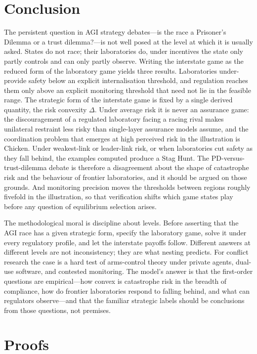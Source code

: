 \documentclass[11pt]{article}
\theoremstyle{plain}
\theoremstyle{definition}
\theoremstyle{remark}
\newcommand{\Delt}{\Delta}
\begin{document}
\section{Conclusion}

The persistent question in AGI strategy debates---is the race a Prisoner's Dilemma or a trust dilemma?---is not well posed at the level at which it is usually asked. States do not race; their laboratories do, under incentives the state only partly controls and can only partly observe. Writing the interstate game as the reduced form of the laboratory game yields three results. Laboratories under-provide safety below an explicit internalisation threshold, and regulation reaches them only above an explicit monitoring threshold that need not lie in the feasible range. The strategic form of the interstate game is fixed by a single derived quantity, the risk convexity $\Delt$. Under average risk it is never an assurance game: the discouragement of a regulated laboratory facing a racing rival makes unilateral restraint less risky than single-layer assurance models assume, and the coordination problem that emerges at high perceived risk in the illustration is Chicken. Under weakest-link or leader-link risk, or when laboratories cut safety as they fall behind, the examples computed produce a Stag Hunt. The PD-versus-trust-dilemma debate is therefore a disagreement about the shape of catastrophe risk and the behaviour of frontier laboratories, and it should be argued on those grounds. And monitoring precision moves the thresholds between regions roughly fivefold in the illustration, so that verification shifts which game states play before any question of equilibrium selection arises.

The methodological moral is discipline about levels. Before asserting that the AGI race has a given strategic form, specify the laboratory game, solve it under every regulatory profile, and let the interstate payoffs follow. Different answers at different levels are not inconsistency; they are what nesting predicts. For conflict research the case is a hard test of arms-control theory under private agents, dual-use software, and contested monitoring. The model's answer is that the first-order questions are empirical---how convex is catastrophe risk in the breadth of compliance, how do frontier laboratories respond to falling behind, and what can regulators observe---and that the familiar strategic labels should be conclusions from those questions, not premises.

\appendix
\section{Proofs}
\end{document}
